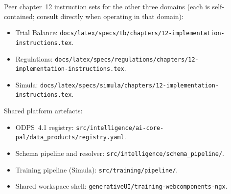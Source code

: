 Peer chapter~12 instruction sets for the other three domains (each
is self-contained; consult directly when operating in that domain):
\begin{itemize}
  \item Trial Balance:
    \texttt{docs/latex/specs/tb/chapters/12-implementation-instructions.tex}.
  \item Regulations:
    \texttt{docs/latex/specs/regulations/chapters/12-implementation-instructions.tex}.
  \item Simula:
    \texttt{docs/latex/specs/simula/chapters/12-implementation-instructions.tex}.
\end{itemize}

Shared platform artefacts:
\begin{itemize}
  \item ODPS~4.1 registry:
    \texttt{src/intelligence/ai-core-pal/data\_products/registry.yaml}.
  \item Schema pipeline and resolver:
    \texttt{src/intelligence/schema\_pipeline/}.
  \item Training pipeline (Simula):
    \texttt{src/training/pipeline/}.
  \item Shared workspace shell:
    \texttt{generativeUI/training-webcomponents-ngx}.
\end{itemize}
